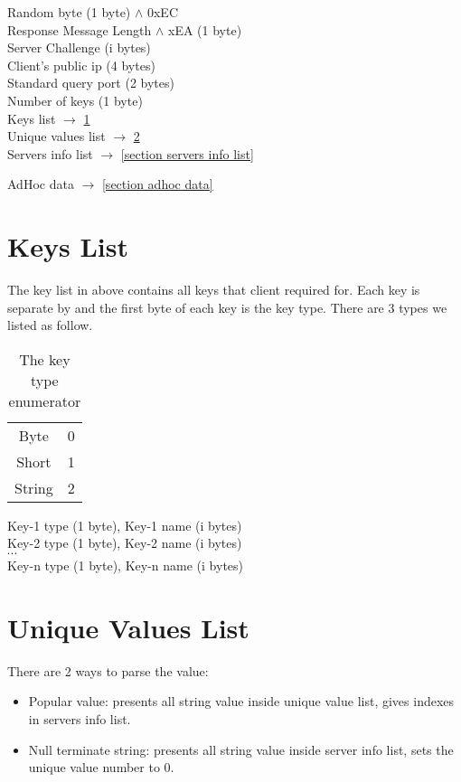 \documentclass[oneside,titlepage,a4paper]{Definition/retrospy} %
\begin{document}
\ServerResponse

\begin{mybox}[label=server list response]
Random byte (1 byte) $ \land $ 0xEC \\
Response Message Length $ \land $ xEA (1 byte)\\
Server Challenge (i bytes)\\
Client's public ip (4 bytes)\\
Standard query port (2 bytes)\\
Number of keys (1 byte)\\
Keys list $\rightarrow$ \ref{section key list}\\
Unique values list $\rightarrow$ \ref{section unique value list}\\
Servers info list  $\rightarrow$ \ref{section servers info list}

AdHoc data $\rightarrow$ \ref{section adhoc data}
\end{mybox}

\section{Keys List}\label{section key list}
The key list in above contains all keys that client required for. Each key is separate by  and the first byte of each key is the key type. There are 3 types we listed as follow.

\begin{table}[H]
	\centering
	\begin{tabular}{|c|c|}
		\hline
		\tbf{Key type}&\tbf{Value}\\\hline
		Byte & 0 \\\hline
		Short & 1 \\\hline
		String & 2 \\\hline
	\end{tabular}
\caption{The key type enumerator}
\end{table}

\begin{mybox}[label=key list]
	Key-1 type (1 byte), Key-1 name (i bytes)\\
	Key-2 type (1 byte), Key-2 name (i bytes)\\
	$\cdots$ \\
	Key-n type (1 byte), Key-n name (i bytes)
\end{mybox}

\section{Unique Values List}\label{section unique value list}
There are 2 ways to parse the value:
\begin{itemize}
	\item Popular value: presents all string value inside unique value list, gives indexes in servers info list.
	\item Null terminate string: presents all string value inside server info list, sets the unique value number to 0.
\end{itemize}
\end{document}
